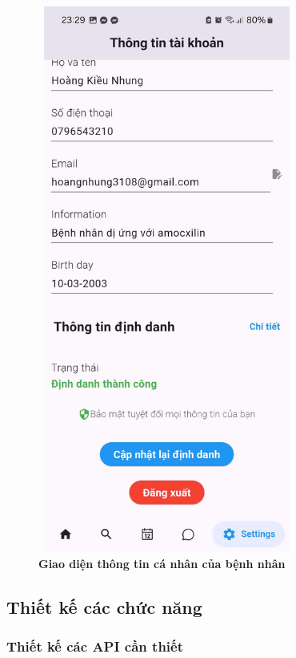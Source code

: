 \begin{figure}[H]
	\centering
	\includegraphics[width=8.5cm,height=18cm]{Images/AppUI/infoPatient.jpg}
	\caption[Giao diện thông tin cá nhân của bệnh nhân]{\bfseries \fontsize{12pt}{0pt}\selectfont Giao diện thông tin cá nhân của bệnh nhân}
	\label{TimePickWithDoctor}
\end{figure}
	\subsection{Thiết kế các chức năng}

	\subsubsection{Thiết kế các API cần thiết}



